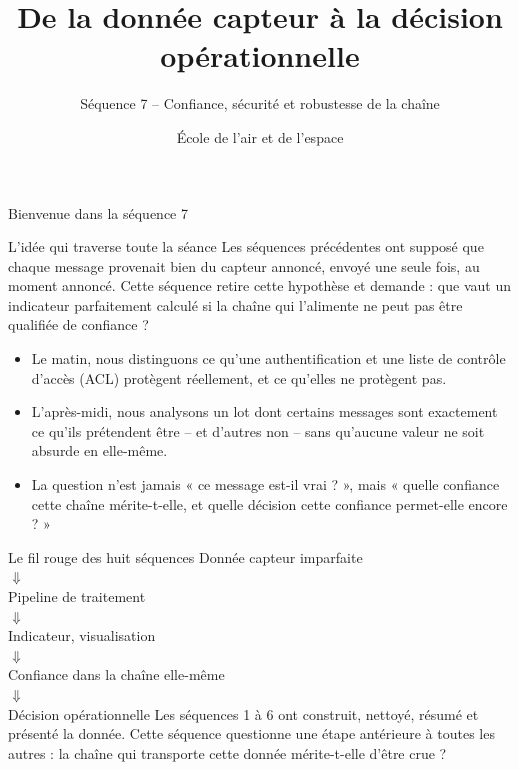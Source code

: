 \documentclass[aspectratio=169]{beamer}
\title{De la donnée capteur à la décision opérationnelle}
\subtitle{Séquence 7 -- Confiance, sécurité et robustesse de la chaîne}
\author{École de l'air et de l'espace}
\date{}
\begin{document}
\begin{frame}
  \titlepage
\end{frame}

\begin{frame}{Bienvenue dans la séquence 7}
  \begin{block}{L'idée qui traverse toute la séance}
    Les séquences précédentes ont supposé que chaque message provenait bien du capteur annoncé, envoyé une seule fois, au moment annoncé. Cette séquence retire cette hypothèse et demande : que vaut un indicateur parfaitement calculé si la chaîne qui l'alimente ne peut pas être qualifiée de confiance ?
  \end{block}
  \begin{itemize}
    \item Le matin, nous distinguons ce qu'une authentification et une liste de contrôle d'accès (ACL) protègent réellement, et ce qu'elles ne protègent pas.
    \item L'après-midi, nous analysons un lot dont certains messages sont exactement ce qu'ils prétendent être -- et d'autres non -- sans qu'aucune valeur ne soit absurde en elle-même.
    \item La question n'est jamais « ce message est-il vrai ? », mais « quelle confiance cette chaîne mérite-t-elle, et quelle décision cette confiance permet-elle encore ? »
  \end{itemize}
\end{frame}

\begin{frame}{Le fil rouge des huit séquences}
  \centering
  \Large Donnée capteur imparfaite\\[2mm]
  $\Downarrow$\\[-1mm]
  Pipeline de traitement\\[-1mm]
  $\Downarrow$\\[-1mm]
  Indicateur, visualisation\\[-1mm]
  $\Downarrow$\\[-1mm]
  \alert{Confiance dans la chaîne elle-même}\\[-1mm]
  $\Downarrow$\\[-1mm]
  Décision opérationnelle
  \vfill
  \normalsize Les séquences 1 à 6 ont construit, nettoyé, résumé et présenté la donnée. Cette séquence questionne une étape antérieure à toutes les autres : la chaîne qui transporte cette donnée mérite-t-elle d'être crue ?
\end{frame}
\end{document}
